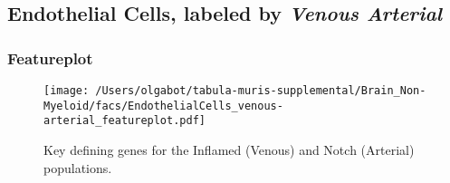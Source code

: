 \clearpage
\subsection{Endothelial Cells, labeled by \emph{Venous Arterial}}

\clearpage
\subsubsection{Featureplot}
\begin{figure}[h]
\centering
\texttt{[image: /Users/olgabot/tabula-muris-supplemental/Brain\_Non-Myeloid/facs/EndothelialCells\_venous-arterial\_featureplot.pdf]}

\caption{Key defining genes for the Inflamed (Venous) and Notch (Arterial) populations.
}
\end{figure}

